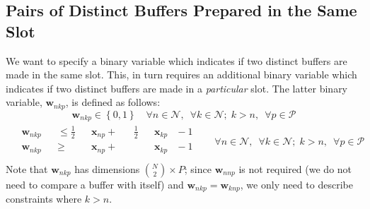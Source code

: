 \subsection{Pairs of Distinct Buffers Prepared in the Same Slot}
\label{SS.constr6}
We want to specify a binary variable which indicates if two distinct
buffers are made in the same slot.
This, in turn requires an additional binary variable which indicates if two
distinct buffers are made in a \emph{particular} slot.
The latter binary variable, $ \boldsymbol{w}_{nkp} $, is defined as follows:
\begin{equation}
    \boldsymbol{w}_{nkp} \in \left\{ 0, 1 \right\} \quad \forall n \in 
    \mathcal{N}, \enspace \forall k \in \mathcal{N}; \; k > n, \enspace 
    \forall p \in \mathcal{P}
    \label{eq.w}
\end{equation}
\begin{equation}
    \begin{split}
        \begin{alignedat}{11}
            &\boldsymbol{w}_{nkp} {}&&\le{} \tfrac{1}{2} &&\boldsymbol{x}_{np}
            {}+{} &&\tfrac{1}{2} && \boldsymbol{x}_{kp} &{}-{} 1\\
            &\boldsymbol{w}_{nkp} {}&&\ge{} &&\boldsymbol{x}_{np} {}+{} &&
            && \boldsymbol{x}_{kp} &{}-{} 1\\
        \end{alignedat}
    \end{split}
    \quad
    \begin{split}
        \forall n \in \mathcal{N}, \enspace \forall k \in \mathcal{N}; \; 
        k > n, \enspace \forall p \in \mathcal{P}
    \end{split}
    \label{eq.w1}
\end{equation}
Note that $\boldsymbol{w}_{nkp}$ has dimensions
$\binom{N}{2} \times P$; since $\boldsymbol{w}_{nnp}$ is
not required (we do not need to compare a buffer with itself) and
$\boldsymbol{w}_{nkp} = \boldsymbol{w}_{knp}$, we only need to describe
constraints where $k > n$.

